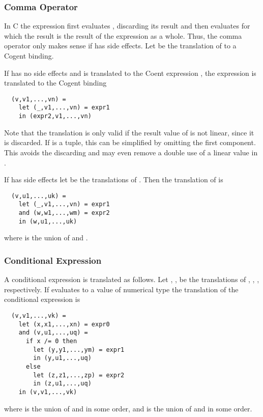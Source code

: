 \subsubsection{Comma Operator}

In C the expression  first evaluates , discarding its result and then evaluates  for which
the result is the result of the expression as a whole. Thus, the comma operator only makes sense if  has side
effects. Let  be the translation of  to a Cogent binding.

If  has no side effects and is translated to the Coent expression , the expression 
is translated to the Cogent binding
\begin{verbatim}
  (v,v1,...,vn) = 
    let (_,v1,...,vn) = expr1
    in (expr2,v1,...,vn) 
\end{verbatim}
Note that the translation is only valid if the result value of  is not linear, since it is discarded. If 
 is a tuple, this can be simplified by omitting the first component. This avoids the discarding and 
may even remove a double use of a linear value in .

If  has side effects let  be the translations of . Then the translation of 
 is 
\begin{verbatim}
  (v,u1,...,uk) = 
    let (_,v1,...,vn) = expr1
    and (w,w1,...,wm) = expr2
    in (w,u1,...,uk) 
\end{verbatim}
where  is the union of  and . 

\subsubsection{Conditional Expression}

A conditional expression  is translated as follows. Let , 
,  be the translations of 
, , , respectively.
If  evaluates to a value of numerical type the translation of the conditional expression is 
\begin{verbatim}
  (v,v1,...,vk) = 
    let (x,x1,...,xn) = expr0
    and (v,u1,...,uq) =
      if x /= 0 then 
        let (y,y1,...,ym) = expr1 
        in (y,u1,...,uq)
      else
        let (z,z1,...,zp) = expr2
        in (z,u1,...,uq)
    in (v,v1,...,vk) 
\end{verbatim}
where  is the union of  and  in some order, and 
 is the union of  and  in some order.

